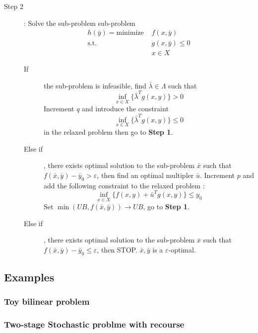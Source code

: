 \begin{algorithm}[h!]
    \begin{description}
        \item[Step 2] : Solve the sub-problem sub-problem \begin{align*}
            h(\bar y) = 
            \textrm{minimize } & f(x, \bar y)\\
            \textrm{s.t. } & g(x, \bar y) \le 0\\
            & x\in X
        \end{align*}
        \begin{description}
            \item[If] the sub-problem is infeasible, find $\bar\lambda\in\Lambda$ such that \[ \inf_{ x\in X }\{ \bar \lambda^Tg(x,y) \} > 0 \] Increment $q$ and introduce the constraint \[ \inf_{ x\in X }\{ \bar \lambda^Tg(x,y) \} \le 0 \] in the relaxed problem then go to \textbf{Step 1}.
            \item[Else if], there exists optimal solution to the sub-problem $\bar x$ such that $f(\bar x, \bar y) - \bar y_0 > \varepsilon$, then find an optimal multipler $\bar u$. Increment $p$ and add the following constraint to the relaxed problem :
            \[ \inf_{x\in X}\{ f(x,y) + \bar{u}^Tg(x,y) \} \le y_0 \] 
            Set $\min(UB, f(\bar x, \bar y))\rightarrow UB$, go to \textbf{Step 1}.
            \item[Else if], there exists optimal solution to the sub-problem $\bar x$ such that $f(\bar x, \bar y) - \bar y_0 \le \varepsilon$, then STOP. $\bar x, \bar y$ is a $\varepsilon$-optimal. 
        \end{description} 
    \end{description}
\end{algorithm}

\subsection{Examples}
\subsubsection{Toy bilinear problem}

\subsubsection{Two-stage Stochastic problme with recourse}